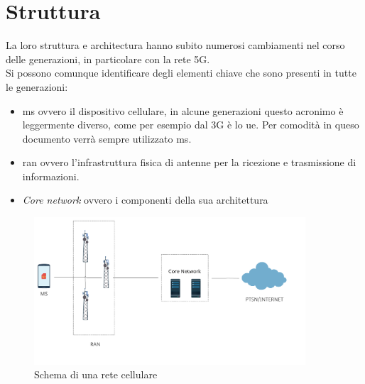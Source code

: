 \section{Struttura}
La loro struttura e architectura hanno subito numerosi cambiamenti nel corso delle generazioni, in particolare con la rete
5G.\\
Si possono comunque identificare degli elementi chiave che sono presenti in tutte le generazioni:
\begin{itemize}
    \item \gls{ms} ovvero il dispositivo cellulare, in alcune generazioni questo acronimo è leggermente diverso, come per esempio dal 3G è
    lo \gls{ue}. Per comodità in queso documento verrà sempre utilizzato \gls{ms}.
    \item \gls{ran} ovvero l'infrastruttura fisica di antenne per la ricezione e trasmissione di informazioni.
    \item \textit{Core network} ovvero i componenti della sua architettura
\end{itemize}
\begin{figure}[h]
    \centering
    \includegraphics[width=0.9\textwidth]{images/cellular-network-basic-scheme.png}
    \caption{Schema di una rete cellulare}
\end{figure}

\clearpage

